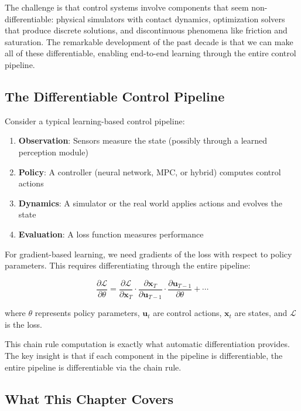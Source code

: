 The challenge is that control systems involve components that seem non-differentiable: physical simulators with contact dynamics, optimization solvers that produce discrete solutions, and discontinuous phenomena like friction and saturation. The remarkable development of the past decade is that we can make all of these differentiable, enabling end-to-end learning through the entire control pipeline.

\subsection{The Differentiable Control Pipeline}

Consider a typical learning-based control pipeline:

\begin{enumerate}
    \item \textbf{Observation}: Sensors measure the state (possibly through a learned perception module)
    \item \textbf{Policy}: A controller (neural network, MPC, or hybrid) computes control actions
    \item \textbf{Dynamics}: A simulator or the real world applies actions and evolves the state
    \item \textbf{Evaluation}: A loss function measures performance
\end{enumerate}

For gradient-based learning, we need gradients of the loss with respect to policy parameters. This requires differentiating through the entire pipeline:

\begin{equation}
\frac{\partial \mathcal{L}}{\partial \theta} = \frac{\partial \mathcal{L}}{\partial \mathbf{x}_T} \cdot \frac{\partial \mathbf{x}_T}{\partial \mathbf{u}_{T-1}} \cdot \frac{\partial \mathbf{u}_{T-1}}{\partial \theta} + \cdots
\label{eq:chain_rule_control}
\end{equation}

where $\theta$ represents policy parameters, $\mathbf{u}_t$ are control actions, $\mathbf{x}_t$ are states, and $\mathcal{L}$ is the loss.

This chain rule computation is exactly what automatic differentiation provides. The key insight is that if each component in the pipeline is differentiable, the entire pipeline is differentiable via the chain rule.

\subsection{What This Chapter Covers}

